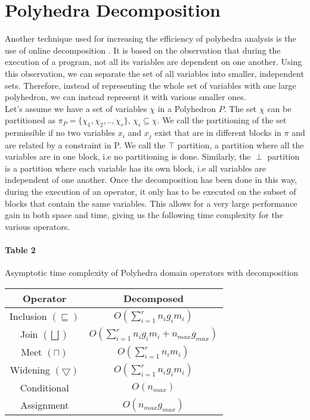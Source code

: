  \section{Polyhedra Decomposition}
Another technique used for increasing the efficiency of polyhedra analysis is the use of online decomposition \cite{singh2017fast}. It is based on the observation that during the execution of a program, not all its variables are dependent on one another. Using this observation, we can separate the set of all variables into smaller, independent sets. Therefore, instead of representing the whole set of variables with one large polyhedron, we can instead represent it with various smaller ones.\\ Let's assume we have a set of variables $\chi$ in a Polyhedron $P$. The set $\chi$ can be partitioned as $\pi_P=\{ \chi_1,\chi_2,..,\chi_r\}$, $\chi_i\subseteq\chi $. We call the partitioning of the set permissible if no two variables $x_i$ and $x_j$ exist that are in different blocks in $\pi$ and are related by a constraint in P. We call the $\top$ partition, a partition where all the variables are in one block, i.e no partitioning is done. Similarly, the $\perp$ partition is a partition where each variable has its own block, i.e all variables are independent of one another. Once the decomposition has been done in this way, during the execution of an operator, it only has to be executed on the subset of blocks that contain the same variables. This allows for a very large performance gain in both space and time, giving us the following time complexity for the various operators.

\paragraph{Table 2} Asymptotic time complexity of Polyhedra domain operators with decomposition

\begin{center}
\begin{tabular}{||c c||} 
 
 \hline
 Operator & Decomposed  \\ [0.5ex] 
 \hline
 Inclusion $(\sqsubseteq)$ & $O(\sum_{i=1}^r n_ig_im_i)$\\ 
 \hline
 Join $(\bigsqcup)$ & $O(\sum_{i=1}^r n_i g_i m_i + n_{max} g_{max})$ \\
 \hline
 Meet $(\sqcap)$ & $O(\sum_{i=1}^r n_i m_i)$ \\
 \hline
 Widening $(\bigtriangledown)$ & $O(\sum_{i=1}^r n_i g_i m_i)$\\
 \hline
 Conditional & $O(n_{max})$ \\ 
 \hline
 Assignment & $O(n_{max}g_{max})$ \\ 
 
 
 \hline
\end{tabular}
\end{center}

